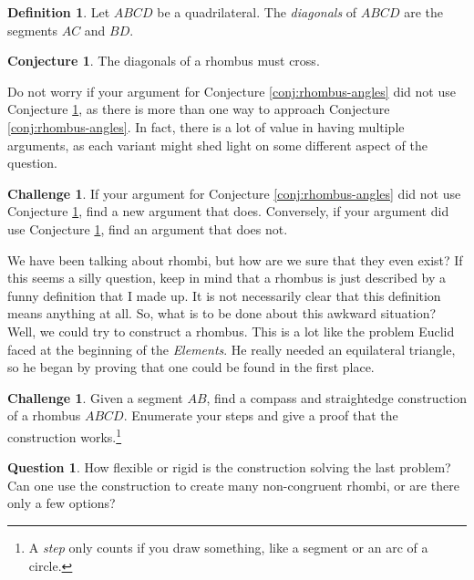 \documentclass{tufte-handout}
\theoremstyle{definition}
\newtheorem{conjecture}[problem]{Conjecture}
\newtheorem*{definition}{Definition}
\newtheorem{question}[problem]{Question}
\newtheorem{challenge}[problem]{Challenge}
\begin{document}
\begin{definition}\label{defn:diagonals}
Let $ABCD$ be a quadrilateral. The \emph{diagonals} of $ABCD$ are the segments $AC$ and $BD$.
\end{definition}

\begin{conjecture}\label{conj:rhombus-diagonals}
The diagonals of a rhombus must cross.
\end{conjecture}



Do not worry if your argument for Conjecture \ref{conj:rhombus-angles} did not use Conjecture \ref{conj:rhombus-diagonals}, as there is more than one way to approach Conjecture \ref{conj:rhombus-angles}.
In fact, there is a lot of value in having multiple arguments, as each variant might shed light on some different aspect of the question.

\begin{challenge}\label{conj:rhombus-angles-redo}
If your argument for Conjecture \ref{conj:rhombus-angles} did not use Conjecture \ref{conj:rhombus-diagonals}, find a new argument that does.
Conversely, if your argument did use Conjecture \ref{conj:rhombus-diagonals}, find an argument that does not.
\end{challenge}


We have been talking about rhombi, but how are we sure that they even exist?
If this seems a silly question, keep in mind that a rhombus is just described by a funny definition that I made up.
It is not necessarily clear that this definition means anything at all.
So, what is to be done about this awkward situation?
Well, we could try to construct a rhombus.
This is a lot like the problem Euclid faced at the beginning of the \emph{Elements}.
He really needed an equilateral triangle, so he began by proving that one could be found in the first place.

\begin{challenge}\label{prob:rhombus-construct}
Given a segment $AB$, find a compass and straightedge construction of a rhombus $ABCD$.
Enumerate your steps and give a proof that the construction works.\footnote{A \emph{step} only counts if you draw something, like a segment or an arc of a circle.}
\end{challenge}

\begin{question}\label{prob:rhombus-flexible}
How flexible or rigid is the construction solving the last problem?
Can one use the construction to create many non-congruent rhombi, or are there only a few options?
\end{question}
\end{document}
